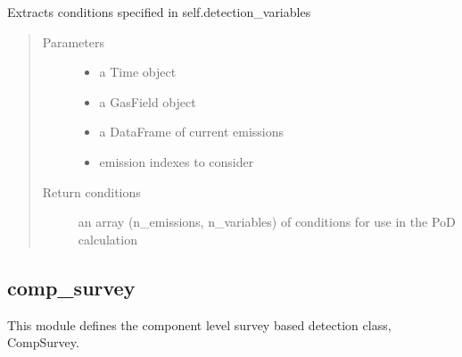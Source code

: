 \documentclass[letterpaper,10pt,english]{sphinxmanual}
\begin{document}
\begin{fulllineitems}
\begin{fulllineitems}
\end{fulllineitems}


\begin{fulllineitems}
\label{\detokenize{index:feast.DetectionModules.abstract_detection_method.DetectionMethod.get_current_conditions}}
Extracts conditions specified in self.detection\_variables
\begin{quote}\begin{description}
\item[{Parameters}] \leavevmode\begin{itemize}
\item {} 
 \textendash{} a Time object

\item {} 
 \textendash{} a GasField object

\item {} 
 \textendash{} a DataFrame of current emissions

\item {} 
 \textendash{} emission indexes to consider

\end{itemize}

\item[{Return conditions}] \leavevmode
an array (n\_emissions, n\_variables) of conditions for use in the PoD calculation

\end{description}\end{quote}

\end{fulllineitems}


\end{fulllineitems}



\subsection{comp\_survey}
\label{\detokenize{index:module-feast.DetectionModules.comp_survey}}\label{\detokenize{index:comp-survey}}
This module defines the component level survey based detection class, CompSurvey.
\end{document}
